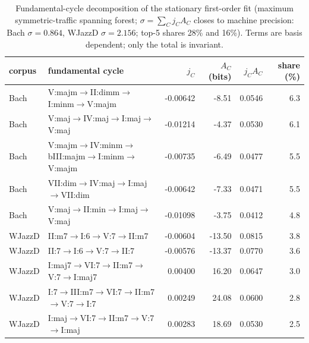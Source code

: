 \documentclass[11pt]{article}
\begin{document}
\begin{table}[t]\centering\small
\caption{Fundamental-cycle decomposition of the stationary first-order fit (maximum symmetric-traffic spanning forest; $\sigma=\sum_C j_C A_C$ closes to machine precision: Bach $\sigma=0.864$, WJazzD $\sigma=2.156$; top-5 shares 28\% and 16\%). Terms are basis dependent; only the total is invariant.}\label{tab:cyc}
\begin{tabular}{llrrrr}\toprule corpus & fundamental cycle & $j_C$ & $A_C$ (bits) & $j_C A_C$ & share (\%) \\ \midrule
Bach & V:majm$\rightarrow$II:dimm$\rightarrow$I:minm$\rightarrow$V:majm & -0.00642 & -8.51 & 0.0546 & 6.3 \\
Bach & V:maj$\rightarrow$IV:maj$\rightarrow$I:maj$\rightarrow$V:maj & -0.01214 & -4.37 & 0.0530 & 6.1 \\
Bach & V:majm$\rightarrow$IV:minm$\rightarrow$bIII:majm$\rightarrow$I:minm$\rightarrow$V:majm & -0.00735 & -6.49 & 0.0477 & 5.5 \\
Bach & VII:dim$\rightarrow$IV:maj$\rightarrow$I:maj$\rightarrow$VII:dim & -0.00642 & -7.33 & 0.0471 & 5.5 \\
Bach & V:maj$\rightarrow$II:min$\rightarrow$I:maj$\rightarrow$V:maj & -0.01098 & -3.75 & 0.0412 & 4.8 \\
WJazzD & II:m7$\rightarrow$I:6$\rightarrow$V:7$\rightarrow$II:m7 & -0.00604 & -13.50 & 0.0815 & 3.8 \\
WJazzD & II:7$\rightarrow$I:6$\rightarrow$V:7$\rightarrow$II:7 & -0.00576 & -13.37 & 0.0770 & 3.6 \\
WJazzD & I:maj7$\rightarrow$VI:7$\rightarrow$II:m7$\rightarrow$V:7$\rightarrow$I:maj7 & 0.00400 & 16.20 & 0.0647 & 3.0 \\
WJazzD & I:7$\rightarrow$III:m7$\rightarrow$VI:7$\rightarrow$II:m7$\rightarrow$V:7$\rightarrow$I:7 & 0.00249 & 24.08 & 0.0600 & 2.8 \\
WJazzD & I:maj$\rightarrow$VI:7$\rightarrow$II:m7$\rightarrow$V:7$\rightarrow$I:maj & 0.00283 & 18.69 & 0.0530 & 2.5 \\
\bottomrule\end{tabular}\end{table}
\end{document}
